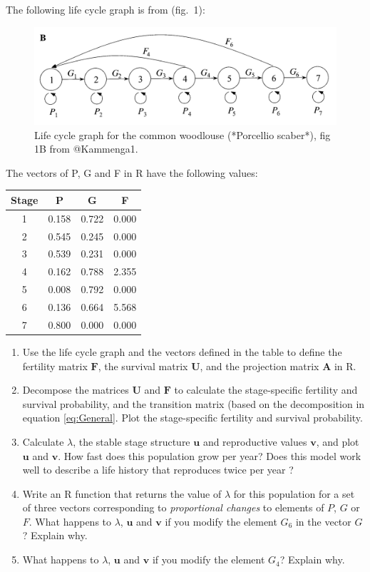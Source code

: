 \documentclass[
]{book}
\begin{document}
The following life cycle graph is from \citet{Kammenga1} (fig.~1):

\begin{figure}
\includegraphics[width=0.8\linewidth]{Porcellio_scaber2} \caption{Life cycle graph for the common woodlouse (*Porcellio scaber*), fig 1B from @Kammenga1.}\label{fig:Porcellio2}
\end{figure}

The vectors of P, G and F in R have the following values:

\begin{tabular}{c|c|c|c}
\hline
Stage & P & G & F\\
\hline
1 & 0.158 & 0.722 & 0.000\\
\hline
2 & 0.545 & 0.245 & 0.000\\
\hline
3 & 0.539 & 0.231 & 0.000\\
\hline
4 & 0.162 & 0.788 & 2.355\\
\hline
5 & 0.008 & 0.792 & 0.000\\
\hline
6 & 0.136 & 0.664 & 5.568\\
\hline
7 & 0.800 & 0.000 & 0.000\\
\hline
\end{tabular}

\begin{enumerate}
\def\labelenumi{\arabic{enumi}.}
\item
  Use the life cycle graph and the vectors defined in the table to define the fertility matrix \(\mathbf{F}\), the survival matrix \(\mathbf{U}\), and the projection matrix \(\mathbf{A}\) in R.
\item
  Decompose the matrices \(\mathbf{U}\) and \(\mathbf{F}\) to calculate the stage-specific fertility and survival probability, and the transition matrix (based on the decomposition in equation \eqref{eq:General}. Plot the stage-specific fertility and survival probability.
\item
  Calculate \(\lambda\), the stable stage structure \(\mathbf{u}\) and reproductive values \(\mathbf{v}\), and plot \(\mathbf{u}\) and \(\mathbf{v}\). How fast does this population grow per year? Does this model work well to describe a life history that reproduces twice per year \citep{Kammenga1}?
\item
  Write an R function that returns the value of \(\lambda\) for this population for a set of three vectors corresponding to \emph{proportional changes} to elements of \(P\), \(G\) or \(F\). What happens to \(\lambda\), \(\mathbf{u}\) and \(\mathbf{v}\) if you modify the element \(G_6\) in the vector \(G\)? Explain why.
\item
  What happens to \(\lambda\), \(\mathbf{u}\) and \(\mathbf{v}\) if you modify the element \(G_4\)? Explain why.
\end{enumerate}
\end{document}
